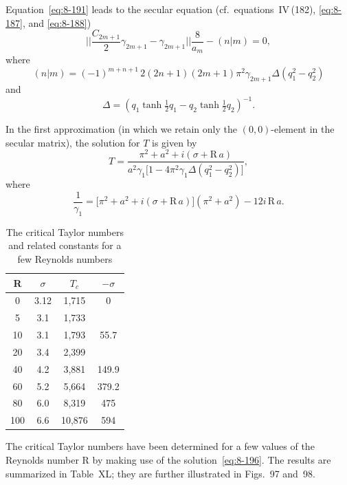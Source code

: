 Equation~\eqref{eq:8-191} leads to the secular equation (cf.\ equations~IV\,(182), \eqref{eq:8-187}, and \eqref{eq:8-188})
\begin{equation}
\label{eq:8-193}
\biggl|\biggl|\frac{C_{2m+1}}{2}\gamma_{2m+1} - \gamma_{2m+1}\biggr|\biggr|\frac{8}{a_m} - (n|m) = 0,
\end{equation}
where
\begin{equation}
\label{eq:8-194}
(n|m) = (-1)^{m+n+1}\,2(2n+1)(2m+1)\pi^2\gamma_{2m+1}\Delta(q_1^2 - q_2^2)
\end{equation}
and
\begin{equation}
\label{eq:8-195}
\Delta = (q_1\tanh\tfrac{1}{2}q_1 - q_2\tanh\tfrac{1}{2}q_2)^{-1}.
\end{equation}

In the first approximation (in which we retain only the $(0,0)$-element in the secular matrix), the solution for $T$ is given by
\begin{equation}
\label{eq:8-196}
T = \frac{\pi^2 + a^2 + i(\sigma + \mathrm{R}\,a)}{a^2\gamma_1\bigl[1-4\pi^2\gamma_1\Delta(q_1^2-q_2^2)\bigr]},
\end{equation}
where
\begin{equation}
\label{eq:8-197}
\frac{1}{\gamma_1} = \bigl[\pi^2 + a^2 + i(\sigma + \mathrm{R}\,a)\bigr](\pi^2+a^2) - 12i\,\mathrm{R}\,a.
\end{equation}

\begin{table}[ht]
\centering
\caption{The critical Taylor numbers and related constants for a few Reynolds numbers}
\label{tab:XL}
\begin{tabular}{cccc}
\hline
R & $\sigma$ & $T_c$ & $-\sigma$ \\
\hline
0 & 3.12 & 1,715 & 0 \\
5 & 3.1 & 1,733 & \\
10 & 3.1 & 1,793 & 55.7 \\
20 & 3.4 & 2,399 & \\
40 & 4.2 & 3,881 & 149.9 \\
60 & 5.2 & 5,664 & 379.2 \\
80 & 6.0 & 8,319 & 475 \\
100 & 6.6 & 10,876 & 594 \\
\hline
\end{tabular}
\end{table}

The critical Taylor numbers have been determined for a few values of the Reynolds number R by making use of the solution~\eqref{eq:8-196}. The results are summarized in Table~XL; they are further illustrated in Figs.~97 and~98.

